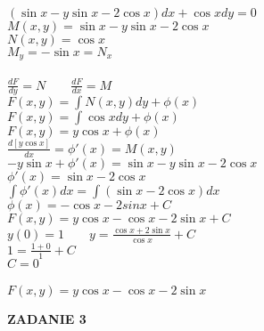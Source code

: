 \documentclass[10pt,a4paper]{article}
\begin{document}
	\begin{center}
		$(\sin x - y\sin x - 2\cos x)dx + \cos x dy = 0 $ \\
		$M(x,y) = \sin x - y\sin x - 2\cos x$ \\
		$N(x,y) = \cos x$ \\
		$M_{y} = -\sin x = N_{x}$ \\
		\\
		$\frac{dF}{dy} = N \qquad \frac{dF}{dx} = M$ \\ 
		$F(x,y) = \int N(x,y) dy + \phi (x)$ \\
		$F(x,y) = \int \cos x dy + \phi (x)$ \\
		$F(x,y) = y\cos x + \phi (x)$ \\
		$\frac{d [y\cos x]}{dx} = \phi'(x) = M(x,y) $ \\
		$-y\sin x + \phi' (x) = \sin x - y\sin x - 2\cos x$ \\
		$\phi'(x) = \sin x - 2\cos x $ \\
		$\int \phi'(x) dx = \int (\sin x - 2\cos x) dx $ \\
		$\phi (x) = -\cos x - 2sin x + C$ \\
		$F(x,y) = y\cos x - \cos x - 2\sin x + C$ \\
		$y(0)=1  \qquad y=\frac{\cos x + 2\sin x}{\cos x} + C$ \\
		$1 = \frac{1 + 0}{1} + C$ \\
		$C = 0 $ \\
		\\
		$F(x,y) = y\cos x - \cos x - 2\sin x  $
		
	\newpage
	\end{center}
	\textbf{ZADANIE 3}
\end{document}
